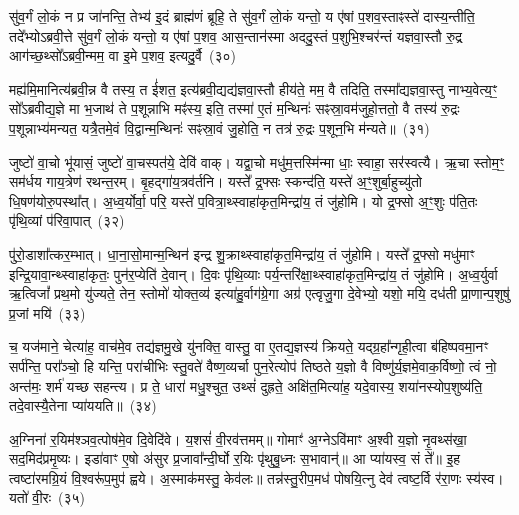 सु॑व॒र्गं लो॒कं न प्र जा॑नन्ति॒ तेभ्य॑ इ॒दं ब्राह्म॑णं ब्रूहि॒ ते सु॑व॒र्गं लो॒कं यन्तो॒ य ए॑षां प॒शव॒स्ताꣴस्ते॑ दास्य॒न्तीति॒ तदे᳚भ्यो\-ऽब्रवी॒त्ते सु॑व॒र्गं लो॒कं यन्तो॒ य ए॑षां प॒शव॒ आस॒न्तान॑स्मा अददु॒स्तं प॒शुभि॒श्चर॑न्तं यज्ञवा॒स्तौ रु॒द्र आग॑च्छ॒थ्सो᳚\-ऽब्रवी॒न्मम॒ वा इ॒मे प॒शव॒ इत्यदु॒र्वै~(३०)

मह्य॑मि॒मानित्य॑ब्रवी॒न्न वै तस्य॒ त ई॑शत॒ इत्य॑ब्रवी॒द्यद्य॑ज्ञवा॒स्तौ हीय॑ते॒ मम॒ वै तदिति॒ तस्मा᳚द्यज्ञवा॒स्तु नाभ्य॒वेत्य॒ꣳ॒ सो᳚\-ऽब्रवीद्य॒ज्ञे मा भ॒जाथ॑ ते प॒शून्नाभि मꣴ॑स्य॒ इति॒ तस्मा॑ ए॒तं म॒न्थिनः॑ सꣴस्रा॒वम॑जुहो॒त्ततो॒ वै तस्य॑ रु॒द्रः प॒शून्नाभ्य॑मन्यत॒ यत्रै॒तमे॒वं वि॒द्वान्म॒न्थिनः॑ सꣴस्रा॒वं जु॒होति॒ न तत्र॑ रु॒द्रः प॒शून॒भि म॑न्यते॥~(३१)

{}%

जुष्टो॑ वा॒चो भू॑यासं॒ जुष्टो॑ वा॒चस्पत॑ये॒ देवि॑ वाक्। यद्वा॒चो मधु॑म॒त्तस्मि॑न्मा धाः॒ स्वाहा॒ सर॑स्वत्यै। ऋ॒चा स्तोम॒ꣳ॒ सम॑र्धय गाय॒त्रेण॑ रथन्त॒रम्। बृ॒हद्गा॑य॒त्रव॑र्तनि। यस्ते᳚ द्र॒फ्सः स्कन्द॑ति॒ यस्ते॑ अ॒ꣳ॒शुर्बा॒हुच्यु॑तो धि॒षण॑योरु॒पस्था᳚त्। अ॒ध्व॒र्योर्वा॒ परि॒ यस्ते॑ प॒वित्रा॒थ्\-स्वाहा॑कृत॒मिन्द्रा॑य॒ तं जु॑होमि। यो द्र॒फ्सो अ॒ꣳ॒शुः प॑ति॒तः पृ॑थि॒व्यां प॑रिवा॒पात्~(३२)

पु॑रो॒डाशा᳚त्कर॒म्भात्। धा॒ना॒सो॒मान्म॒न्थिन॑ इन्द्र शु॒क्राथ्\-स्वाहा॑कृत॒मिन्द्रा॑य॒ तं जु॑होमि। यस्ते᳚ द्र॒फ्सो मधु॑माꣳ इन्द्रि॒यावा॒न्थ्\-स्वाहा॑कृतः॒ पुन॑र॒प्येति॑ दे॒वान्। दि॒वः पृ॑थि॒व्याः पर्य॒न्तरि॑क्षा॒थ्\-स्वाहा॑कृत॒मिन्द्रा॑य॒ तं जु॑होमि। अ॒ध्व॒र्युर्वा ऋ॒त्विजां᳚ प्रथ॒मो यु॑ज्यते॒ तेन॒ स्तोमो॑ योक्त॒व्य॑ इत्या॑हु॒र्वाग॑ग्रे॒गा अग्र॑ एत्वृजु॒गा दे॒वेभ्यो॒ यशो॒ मयि॒ दध॑ती प्रा॒णान्प॒शुषु॑ प्र॒जां मयि॑~(३३)

च॒ यज॑माने॒ चेत्या॑ह॒ वाच॑मे॒व तद्य॑ज्ञमु॒खे यु॑नक्ति॒ वास्तु॒ वा ए॒तद्य॒ज्ञस्य॑ क्रियते॒ यद्ग्र॒हा᳚न्गृही॒त्वा ब॑हिष्पवमा॒नꣳ सर्प॑न्ति॒ परा᳚ञ्चो॒ हि यन्ति॒ परा॑चीभिः स्तु॒वते॑ वैष्ण॒व्यर्चा पुन॒रेत्योप॑ तिष्ठते य॒ज्ञो वै विष्णु॑र्य॒ज्ञमे॒वाक॒र्विष्णो॒ त्वं नो॒ अन्त॑मः॒ शर्म॑ यच्छ सहन्त्य। प्र ते॒ धारा॑ मधु॒श्चुत॒ उथ्सं॑ दुह्रते॒ अक्षि॑त॒मित्या॑ह॒ यदे॒वास्य॒ शया॑नस्योप॒शुष्य॑ति॒ तदे॒वास्यै॒तेना प्या॑ययति॥~(३४)

{\anuvakamend[{प॒रि॒वा॒पात्प्र॒जां मयि॑ दुह्रते॒ चतु॑र्दश च}]}%

अ॒ग्निना॑ र॒यिम॑श्ञव॒त्पोष॑मे॒व दि॒वेदि॑वे। य॒शसं॑ वी॒रव॑त्तमम्॥ गोमाꣳ॑ अ॒ग्ने\-ऽवि॑माꣳ अ॒श्वी य॒ज्ञो नृ॒वथ्स॑खा॒ सद॒मिद॑प्रमृ॒ष्यः। इडा॑वाꣳ ए॒षो अ॑सुर प्र॒जावा᳚न्दी॒र्घो र॒यिः पृ॑थुबु॒ध्नः स॒भावान्॑॥ आ प्या॑यस्व॒ सं ते᳚॥ इ॒ह त्वष्टा॑रमग्रि॒यं वि॒श्वरू॑प॒मुप॑ ह्वये। अ॒स्माक॑मस्तु॒ केव॑लः॥ तन्न॑स्तु॒रीप॒मध॑ पोषयि॒त्नु देव॑ त्वष्ट॒र्वि र॑रा॒णः स्य॑स्व। यतो॑ वी॒रः~(३५)

